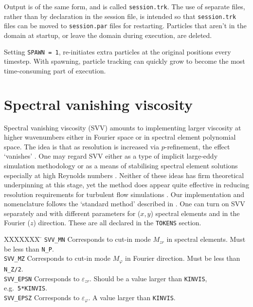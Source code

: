 \documentclass[11pt]{report}
\newcommand{\eg}{e.g.\ } \newcommand{\CC}{\mathrm{c.c.}}
\begin{document}
Output is of the same form, and is called \verb+session.trk+.  The use
of separate files, rather than by declaration in the session file, is
intended so that \verb+session.trk+ files can be moved to
\verb+session.par+ files for restarting.  Particles that aren't in the
domain at startup, or leave the domain during execution, are deleted.

Setting \verb+SPAWN = 1+, re-initiates extra particles at the original
positions every timestep.  With spawning, particle tracking can
quickly grow to become the most time-consuming part of execution.

\section{Spectral vanishing viscosity}
\label{sec.svv}

Spectral vanishing viscosity (SVV) amounts to implementing larger
viscosity at higher wavenumbers either in Fourier space or in spectral
element polynomial space.  The idea is that as resolution is increased
via $p$-refinement, the effect `vanishes' \citep{tadmor89,mot93}.  One
may regard SVV either as a type of implicit large-eddy simulation
methodology \citep{pasquetti06} or as a means of stabilising spectral
element solutions especially at high Reynolds numbers
\citep{xupa04,kish06}. Neither of these ideas has firm theoretical
underpinning at this stage, yet the method does appear quite effective
in reducing resolution requirements for turbulent flow simulations
\citep{ksb12,cnbmo15}.  Our implementation and nomenclature follows
the `standard method' described in \citet{ksb12}.  One can turn on SVV
separately and with different parameters for ($x$,\,$y$) spectral
elements and in the Fourier ($z$) direction.  These are all declared
in the \verb+TOKENS+ section.

\begin{tabbing}
XXXXXXX \= \kill
\texttt{SVV\_MN} \> Corresponds to cut-in mode $M_{zr}$ in 
spectral elements. Must be less than \texttt{N\_P}.\\ 
%
\texttt{SVV\_MZ} \> Corresponds to cut-in mode $M_\varphi$ in 
Fourier direction. Must be less than \texttt{N\_Z/2}.\\
%
\texttt{SVV\_EPSN} \> Corresponds to $\varepsilon_{zr}$. 
Should be a value larger than \texttt{KINVIS}, \eg \texttt{5*KINVIS}.\\
%
\texttt{SVV\_EPSZ} \> Corresponds to $\varepsilon_\varphi$. 
A value larger than \texttt{KINVIS}.
\end{tabbing}
\end{document}
